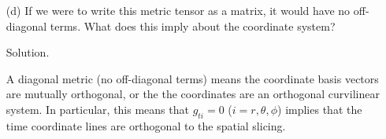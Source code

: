 \documentclass[12pt]{article}
\begin{document}
\begin{enumerate}
  
  \item[(d)] If we were to write this metric tensor as a matrix, it would have no off-diagonal terms. What does this imply about the coordinate system?
  
  \item[Solution.]
  
  A diagonal metric (no off-diagonal terms) means the coordinate basis vectors are mutually orthogonal, or the the coordinates are an orthogonal curvilinear system. In particular, this means that $g_{ti}=0$ ($i=r,\theta,\phi$) implies that the time coordinate lines are orthogonal to the spatial slicing. 

\end{enumerate}
\newpage%
\end{document}
